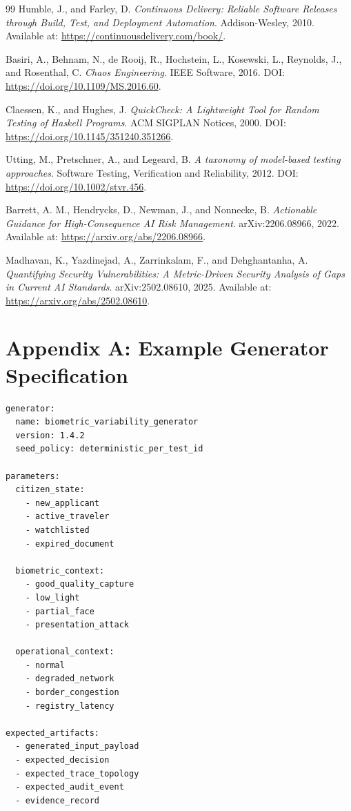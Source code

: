 \documentclass[11pt,a4paper]{article}
\begin{document}
\begin{thebibliography}{99}
Humble, J., and Farley, D.
\textit{Continuous Delivery: Reliable Software Releases through Build, Test, and Deployment Automation}.
Addison-Wesley, 2010. Available at: \url{https://continuousdelivery.com/book/}.

Basiri, A., Behnam, N., de Rooij, R., Hochstein, L., Kosewski, L., Reynolds, J., and Rosenthal, C.
\textit{Chaos Engineering}.
IEEE Software, 2016. DOI: \url{https://doi.org/10.1109/MS.2016.60}.

Claessen, K., and Hughes, J.
\textit{QuickCheck: A Lightweight Tool for Random Testing of Haskell Programs}.
ACM SIGPLAN Notices, 2000. DOI: \url{https://doi.org/10.1145/351240.351266}.

Utting, M., Pretschner, A., and Legeard, B.
\textit{A taxonomy of model-based testing approaches}.
Software Testing, Verification and Reliability, 2012. DOI: \url{https://doi.org/10.1002/stvr.456}.

Barrett, A. M., Hendrycks, D., Newman, J., and Nonnecke, B.
\textit{Actionable Guidance for High-Consequence AI Risk Management}.
arXiv:2206.08966, 2022. Available at: \url{https://arxiv.org/abs/2206.08966}.

Madhavan, K., Yazdinejad, A., Zarrinkalam, F., and Dehghantanha, A.
\textit{Quantifying Security Vulnerabilities: A Metric-Driven Security Analysis of Gaps in Current AI Standards}.
arXiv:2502.08610, 2025. Available at: \url{https://arxiv.org/abs/2502.08610}.

\end{thebibliography}

\appendix

\section{Appendix A: Example Generator Specification}

\begin{lstlisting}
generator:
  name: biometric_variability_generator
  version: 1.4.2
  seed_policy: deterministic_per_test_id

parameters:
  citizen_state:
    - new_applicant
    - active_traveler
    - watchlisted
    - expired_document

  biometric_context:
    - good_quality_capture
    - low_light
    - partial_face
    - presentation_attack

  operational_context:
    - normal
    - degraded_network
    - border_congestion
    - registry_latency

expected_artifacts:
  - generated_input_payload
  - expected_decision
  - expected_trace_topology
  - expected_audit_event
  - evidence_record
\end{lstlisting}
\end{document}
